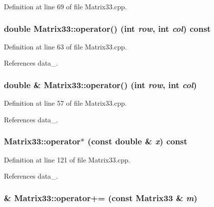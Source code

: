 Definition at line 69 of file Matrix33.cpp.

\subsubsection[{operator()}]{\setlength{\rightskip}{0pt plus 5cm}double Matrix33::operator() (int {\em row}, \/  int {\em col}) const}\label{classMatrix33_a8f0502ab1277c6bb2c95e04046e1ce70}


Definition at line 63 of file Matrix33.cpp.



References data\_\-.

\subsubsection[{operator()}]{\setlength{\rightskip}{0pt plus 5cm}double \& Matrix33::operator() (int {\em row}, \/  int {\em col})}\label{classMatrix33_ab921fd61eae77695c74779bb8680580c}


Definition at line 57 of file Matrix33.cpp.



References data\_\-.

\subsubsection[{operator$\ast$}]{ Matrix33::operator$\ast$ (const double \& {\em x}) const}\label{classMatrix33_af1ac3200903b2c90ef89344ab6dff516}


Definition at line 121 of file Matrix33.cpp.



References data\_\-.

\subsubsection[{operator+=}]{ \& Matrix33::operator+= (const {\bf Matrix33} \& {\em m})}\label{classMatrix33_a2f478995122658b96e587c48796eddfc}


